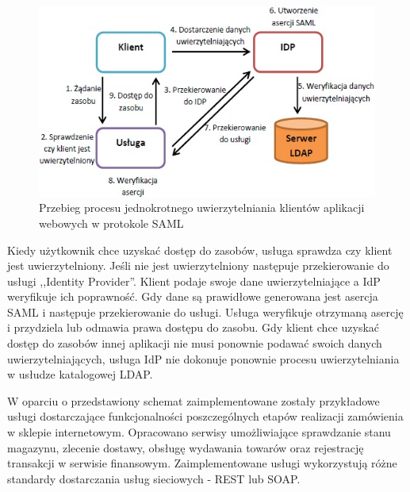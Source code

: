 	\begin{figure}[h]
		\centering
		\includegraphics{img/samlWebSSO.jpg}
		\caption{Przebieg procesu jednokrotnego uwierzytelniania klientów aplikacji webowych w protokole SAML}
		\label{samlSSOSteps}
	\end{figure}
		
	Kiedy użytkownik chce uzyskać dostęp do zasobów, usługa sprawdza czy klient jest uwierzytelniony. Jeśli nie jest uwierzytelniony następuje przekierowanie do usługi ,,Identity Provider''. Klient podaje swoje dane uwierzytelniające a IdP weryfikuje ich poprawność. Gdy dane są prawidłowe generowana jest asercja SAML i następuje przekierowanie do usługi. Usługa weryfikuje otrzymaną asercję i przydziela lub odmawia prawa dostępu do zasobu. Gdy klient chce uzyskać dostęp do zasobów innej aplikacji nie musi ponownie podawać swoich danych uwierzytelniających, usługa IdP nie dokonuje ponownie procesu uwierzytelniania w usłudze katalogowej LDAP.
	
	W oparciu o przedstawiony schemat zaimplementowane zostały przykładowe usługi dostarczające funkcjonalności poszczególnych etapów realizacji zamówienia w sklepie internetowym. Opracowano serwisy umożliwiające sprawdzanie stanu magazynu, zlecenie dostawy, obsługę wydawania towarów oraz rejestrację transakcji w serwisie finansowym. Zaimplementowane usługi wykorzystują różne standardy dostarczania usług sieciowych - REST lub SOAP. 



